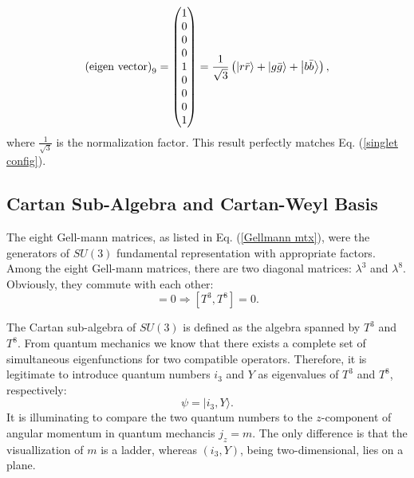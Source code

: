 \documentclass[12pt]{article}
\begin{document}
	\begin{equation}
		\text{(eigen vector)}_9 = \begin{pmatrix}
			1 \\ 0\\ 0\\ 0 \\ 1 \\ 0 \\ 0 \\ 0 \\ 1
		\end{pmatrix} = \frac{1}{\sqrt{3}}\left( \ket{r\bar r} + \ket{g \bar g} + \ket{b \bar b}\right),
	\end{equation}
	where $\frac{1}{\sqrt{3}}$ is the normalization factor. This result perfectly matches Eq. (\ref{singlet config}).
	
	
	
	\subsection{Cartan Sub-Algebra and Cartan-Weyl Basis}
	
	The eight Gell-mann matrices, as listed in Eq. (\ref{Gellmann mtx}), were the generators of $SU(3)$ fundamental representation with appropriate factors. Among the eight Gell-mann matrices, there are two diagonal matrices: $\lambda^3$ and $\lambda^8$. Obviously, they commute with each other:
	\begin{equation}
		[\lambda^3, \lambda^8] = 0 \Rightarrow [T^3, T^8] = 0. 
	\end{equation}
	
	The Cartan sub-algebra of $SU(3)$ is defined as the algebra spanned by $T^3$ and $T^8$. From quantum mechanics we know that there exists a complete set of simultaneous eigenfunctions for two compatible operators. Therefore, it is legitimate to introduce quantum numbers $i_3$ and $Y$ as eigenvalues of $T^3$ and $T^8$, respectively:
	\begin{equation}
		\psi = |i_3, Y\rangle. 
	\end{equation}
	It is illuminating to compare the two quantum numbers to the $z$-component of angular momentum in quantum mechancis $j_z = m$. The only difference is that the visuallization of $m$ is a ladder, whereas $(i_3, Y)$, being two-dimensional, lies on a plane.
	
\end{document}
